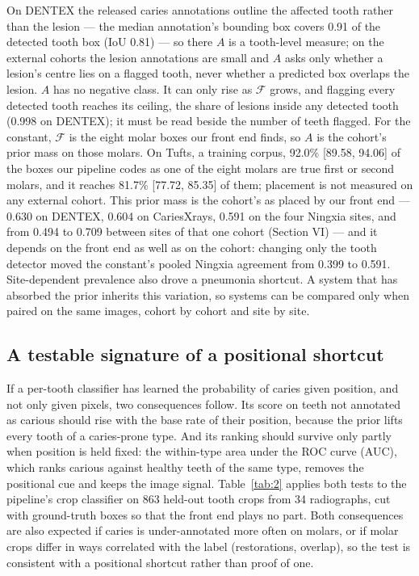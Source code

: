 \documentclass[conference]{IEEEtran}
\begin{document}
On DENTEX the released caries annotations outline the affected tooth rather than the lesion — the median annotation's bounding box covers 0.91 of the detected tooth box (IoU 0.81) — so there $A$ is a tooth-level measure; on the external cohorts the lesion annotations are small and $A$ asks only whether a lesion's centre lies on a flagged tooth, never whether a predicted box overlaps the lesion. $A$ has no negative class. It can only rise as $\mathcal{F}$ grows, and flagging every detected tooth reaches its ceiling, the share of lesions inside any detected tooth (0.998 on DENTEX); it must be read beside the number of teeth flagged. For the constant, $\mathcal{F}$ is the eight molar boxes our front end finds, so $A$ is the cohort's prior mass on those molars. On Tufts, a training corpus, 92.0\% [89.58, 94.06] of the boxes our pipeline codes as one of the eight molars are true first or second molars, and it reaches 81.7\% [77.72, 85.35] of them; placement is not measured on any external cohort. This prior mass is the cohort's as placed by our front end — 0.630 on DENTEX, 0.604 on CariesXrays, 0.591 on the four Ningxia sites, and from 0.494 to 0.709 between sites of that one cohort (Section VI) — and it depends on the front end as well as on the cohort: changing only the tooth detector moved the constant's pooled Ningxia agreement from 0.399 to 0.591. Site-dependent prevalence also drove a pneumonia shortcut. A system that has absorbed the prior inherits this variation, so systems can be compared only when paired on the same images, cohort by cohort and site by site.

\subsection{A testable signature of a positional shortcut}

If a per-tooth classifier has learned the probability of caries given position, and not only given pixels, two consequences follow. Its score on teeth not annotated as carious should rise with the base rate of their position, because the prior lifts every tooth of a caries-prone type. And its ranking should survive only partly when position is held fixed: the within-type area under the ROC curve (AUC), which ranks carious against healthy teeth of the same type, removes the positional cue and keeps the image signal. Table~\ref{tab:2} applies both tests to the pipeline's crop classifier on 863 held-out tooth crops from 34 radiographs, cut with ground-truth boxes so that the front end plays no part. Both consequences are also expected if caries is under-annotated more often on molars, or if molar crops differ in ways correlated with the label (restorations, overlap), so the test is consistent with a positional shortcut rather than proof of one.
\end{document}
